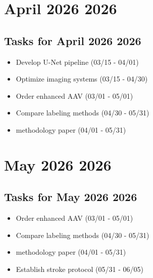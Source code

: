 \documentclass[landscape,a4paper]{article}
\begin{document}
\section*{April 2026 2026}

\begin{center}
\begin{tikzpicture}[scale=0.9]
\end{tikzpicture}
\end{center}

\vspace{1cm}

\subsection*{Tasks for April 2026 2026}
\begin{itemize}
\item Develop U-Net pipeline (03/15 - 04/01)
\item Optimize imaging systems (03/15 - 04/30)
\item Order enhanced AAV (03/01 - 05/01)
\item Compare labeling methods (04/30 - 05/31)
\item methodology paper (04/01 - 05/31)
\end{itemize}
\newpage

\section*{May 2026 2026}

\begin{center}
\begin{tikzpicture}[scale=0.9]
\end{tikzpicture}
\end{center}

\vspace{1cm}

\subsection*{Tasks for May 2026 2026}
\begin{itemize}
\item Order enhanced AAV (03/01 - 05/01)
\item Compare labeling methods (04/30 - 05/31)
\item methodology paper (04/01 - 05/31)
\item Establish stroke protocol (05/31 - 06/05)
\end{itemize}
\newpage
\end{document}
